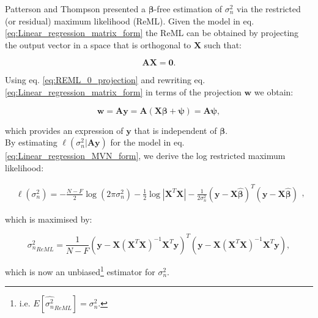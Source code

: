 Patterson and Thompson \cite{patterson1971recovery} presented a $\boldsymbol{\beta}$-free estimation of $\sigma_n^2$ via the restricted (or residual) maximum likelihood (ReML).
Given the model in eq. \eqref{eq:Linear_regression_matrix_form} the ReML can be obtained by projecting the output vector in a space that is orthogonal to $\mathbf{X}$ such that:

\begin{equation}\label{eq:REML_0_projection}
    \mathbf{A}\mathbf{X} = \mathbf{0}.
\end{equation}

Using eq. \eqref{eq:REML_0_projection} and rewriting eq. \eqref{eq:Linear_regression_matrix_form} in terms of the projection $\mathbf{w}$ we obtain:

\begin{equation}\label{eq:REML_w_projection}
    \mathbf{w} = \mathbf{A}\mathbf{y} = \mathbf{A}(\mathbf{X}\boldsymbol{\beta} + \boldsymbol{\psi}) = \mathbf{A}\boldsymbol{\psi},
\end{equation}

which provides an expression of $\mathbf{y}$ that is independent of $\boldsymbol{\beta}$.\\

By estimating $\ell(\sigma_n^2 | \mathbf{A}\mathbf{y})$ for the model in eq. \eqref{eq:Linear_regression_MVN_form}, we derive the log restricted maximum likelihood:

\begin{equation} \label{eq:Linear_regression_log_restricted_likelihood}
\begin{split}
\ell(\sigma_n^2) = -\frac{N-F}{2}\log (2\pi\sigma_n^2) - \frac{1}{2}\log |\mathbf{X}^T\mathbf{X}| 
- \frac{1}{2\sigma_n^2}(\mathbf{y}-\mathbf{X}\hat{\boldsymbol{\beta}})^T(\mathbf{y}-\mathbf{X}\hat{\boldsymbol{\beta}})  
\end{split},
\end{equation}

which is maximised by:

\begin{equation}\label{eq:Linear_regression_REML_sigma}
\hat{\sigma_n^2}_{ReML} =  \frac{1}{N-F}(\mathbf{y}-\mathbf{X}(\mathbf{X}^T\mathbf{X})^{-1}\mathbf{X}^T\mathbf{y})^T(\mathbf{y}-\mathbf{X}(\mathbf{X}^T\mathbf{X})^{-1}\mathbf{X}^T\mathbf{y}),
\end{equation}

which is now an unbiased\footnote{i.e. $E[\hat{\sigma_n^2}_{ReML}] = \sigma_n^2$.} estimator for $\sigma_n^2$. \\

